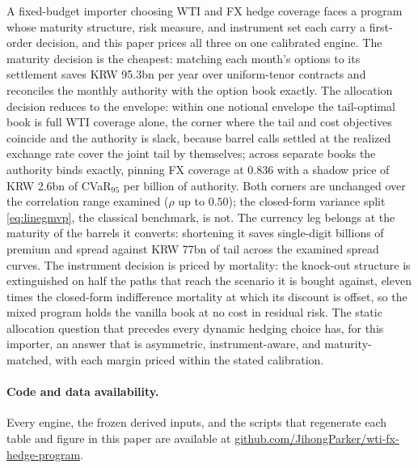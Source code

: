 \documentclass[11pt,a4paper]{article}
\begin{document}
A fixed-budget importer choosing WTI and FX hedge coverage faces a program whose maturity structure, risk measure, and instrument set each carry a first-order decision, and this paper prices all three on one calibrated engine. The maturity decision is the cheapest: matching each month's options to its settlement saves KRW 95.3bn per year over uniform-tenor contracts and reconciles the monthly authority with the option book exactly. The allocation decision reduces to the envelope: within one notional envelope the tail-optimal book is full WTI coverage alone, the corner where the tail and cost objectives coincide and the authority is slack, because barrel calls settled at the realized exchange rate cover the joint tail by themselves; across separate books the authority binds exactly, pinning FX coverage at $0.836$ with a shadow price of KRW 2.6bn of CVaR$_{95}$ per billion of authority. Both corners are unchanged over the correlation range examined ($\rho$ up to $0.50$); the closed-form variance split \eqref{eq:linegmvp}, the classical benchmark, is not. The currency leg belongs at the maturity of the barrels it converts: shortening it saves single-digit billions of premium and spread against KRW 77bn of tail across the examined spread curves. The instrument decision is priced by mortality: the knock-out structure is extinguished on half the paths that reach the scenario it is bought against, eleven times the closed-form indifference mortality at which its discount is offset, so the mixed program holds the vanilla book at no cost in residual risk. The static allocation question that precedes every dynamic hedging choice has, for this importer, an answer that is asymmetric, instrument-aware, and maturity-matched, with each margin priced within the stated calibration.

\paragraph{Code and data availability.} Every engine, the frozen derived inputs, and the scripts that regenerate each table and figure in this paper are available at \url{github.com/JihongParker/wti-fx-hedge-program}.
\end{document}
